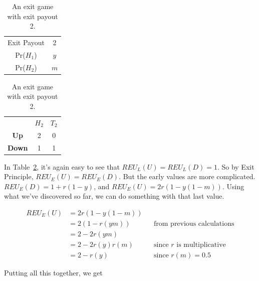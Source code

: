 \documentclass[
  12pt,
  letterpaper,
  DIV=11,
  numbers=noendperiod]{scrreprt}
\begin{document}
\begin{table}

\caption{\label{tbl-two-coin-exit}An exit game with exit payout
2.}\begin{minipage}[t]{0.50\linewidth}

{\centering 

\begin{tabular}[t]{cc}
\toprule
Exit Payout & 2\\
Pr(\(H_1\)) & \(y\)\\
Pr(\(H_2\)) & \(m\)\\
\bottomrule
\end{tabular}

}

\end{minipage}%
%
\begin{minipage}[t]{0.50\linewidth}

{\centering 

\begin{tabular}[t]{ccc}
\toprule
 & \(H_2\) & \(T_2\)\\
\textbf{Up} & 2 & 0\\
\textbf{Down} & 1 & 1\\
\bottomrule
\end{tabular}

}

\end{minipage}%

\end{table}

In Table~\ref{tbl-two-coin-exit}, it's again easy to see that
\(REU_L(U) = REU_L(D) = 1\). So by Exit Principle,
\(REU_E(U) = REU_E(D)\). But the early values are more complicated.
\(REU_E(D) = 1 + r(1-y)\), and \(REU_E(U) = 2r(1-y(1-m))\). Using what
we've discovered so far, we can do something with that last value.

\begin{align*}
REU_E(U) &= 2r(1-y(1-m)) \\
  &= 2(1-r(ym))  && \text{from previous calculations} \\
  &= 2 - 2r(ym) \\
  &= 2 - 2r(y)r(m) && \text{since $r$ is multiplicative} \\
  &= 2 - r(y)  && \text{since $r(m) = 0.5$}
\end{align*}

Putting all this together, we get
\end{document}

